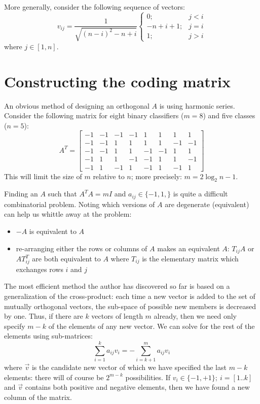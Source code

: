 More generally, consider the following sequence of vectors:
\begin{equation}
	v_{ij} = \frac{1}{\sqrt{(n-i)^2-n+i}} \left \lbrace \begin{array}{rl}
			0; & j < i \\
			-n+i+1; & j=i \\
			1; & j > i
		\end{array} \right .
\end{equation}
where $j \in [1, n]$.


\section{Constructing the coding matrix}

An obvious method of designing an orthogonal $A$ is using harmonic series.
Consider the following matrix for eight binary classifiers ($m=8$) and
five classes ($n=5$):
\begin{equation}
	A^T = \left [ \begin{array}{rrrrrrrr}
			-1 & -1 & -1 & -1 & 1 & 1 & 1 & 1 \\
			-1 & -1 & 1 & 1 & 1 & 1 & -1 & -1 \\
			-1 & -1 & 1 & 1 & -1 & -1 & 1 & 1 \\
			-1 & 1 & 1 & -1 & -1 & 1 & 1 & -1 \\
			-1 & 1 & -1 & 1 & -1 & 1 & -1 & 1
	\end{array} \right ]
\end{equation}
This will limit the size of $m$ relative to $n$; more precisely:
$m=2 \log_2 n - 1$.

Finding an $A$ such that $A^T A = m I$ and $a_{ij} \in \lbrace -1, 1, \rbrace$
is quite a difficult combinatorial problem.
Noting which versions of $A$ are degenerate (equivalent) can help us whittle
away at the problem:
\begin{itemize}
	\item $-A$ is equivalent to $A$
	\item re-arranging either the rows or columns of $A$ makes an equivalent $A$: $T_{ij} A$ or $A T_{ij}^T$ are both equivalent to $A$ where $T_{ij}$ is the elementary matrix which exchanges rows $i$ and $j$
\end{itemize}

The most efficient method the author has discovered so far 
is based on a generalization of the cross-product:
each time a new vector is added to the set of mutually orthogonal vectors, 
the sub-space of possible new members is decreased by one.
Thus, if there are $k$ vectors of length $m$ already, then we need only specify $m-k$
of the elements of any new vector.
We can solve for the rest of the elements using sub-matrices:
\begin{equation}
	\sum_{i=1}^{k} a_{ij} v_i = - \sum_{i=k+1}^m a_{ij} v_i
\end{equation}
where $\vec v$ is the candidate new vector of which we have specified the last
$m-k$ elements: there will of course be $2^{m-k}$ possibilities.
If $v_i \in \lbrace -1, +1 \rbrace;~i=[1..k]$ and $\vec v$ contains both positive and
negative elements, then we have found a new column of the matrix.

